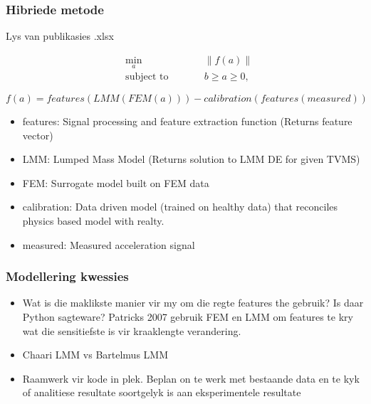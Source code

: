 \documentclass{beamer}
\newcommand{\norm}[1]{\lVert#1\rVert}
\begin{document}
\begin{frame}
\frametitle{Hibriede metode}
Lys van publikasies .xlsx

\begin{subequations}
	\begin{alignat}{2}
	&\!\min_{a}        &\qquad& \norm{f(a)}\label{eq:optProb}\\
	&\text{subject to} &      &   b \geq a \geq 0 ,\label{eq:constraint1}
	\end{alignat}
\end{subequations}

\begin{equation}
	f(a) = features(LMM(FEM(a))) - calibration(features(measured))
\end{equation}

\begin{itemize}
	\item features: Signal processing and feature extraction function (Returns feature vector)
	\item LMM: Lumped Mass Model (Returns solution to LMM DE for given TVMS)
	\item FEM: Surrogate model built on FEM data
	\item calibration: Data driven model (trained on healthy data) that reconciles physics based model with realty. 
	\item measured: Measured acceleration signal
\end{itemize}

\end{frame}



\begin{frame}
\frametitle{Modellering kwessies}
\begin{itemize}
	\item Wat is die maklikste manier vir my om die regte features the gebruik? Is daar Python sagteware? Patricks 2007 gebruik FEM en LMM om features te kry wat die sensitiefste is vir kraaklengte verandering.
	\item Chaari LMM vs Bartelmus LMM
	\item Raamwerk vir kode in plek. Beplan on te werk met bestaande data en te kyk of analitiese resultate soortgelyk is aan eksperimentele resultate
\end{itemize}
\end{frame}
\end{document}
